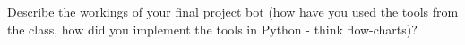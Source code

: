 Describe the workings of your final project bot (how have you used the tools from the class, how did you implement the tools in Python - think flow-charts)?\\